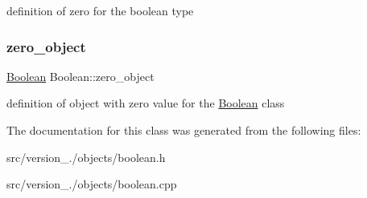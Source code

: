 definition of zero for the boolean type \mbox{\label{classez_1_1objects_1_1Boolean_ab42b94b5b5ddc33cd64501447fdaa33c}} 
\subsubsection{\texorpdfstring{zero\+\_\+object}{zero\_object}}
{\footnotesize\ttfamily \hyperlink{classez_1_1objects_1_1Boolean}{Boolean} Boolean\+::zero\+\_\+object\hspace{0.3cm}{\ttfamily [static]}}

definition of object with zero value for the \hyperlink{classez_1_1objects_1_1Boolean}{Boolean} class 

The documentation for this class was generated from the following files\+:\begin{DoxyCompactItemize}
\item 
src/version\+\_./objects/boolean.\+h\item 
src/version\+\_./objects/boolean.\+cpp\end{DoxyCompactItemize}
